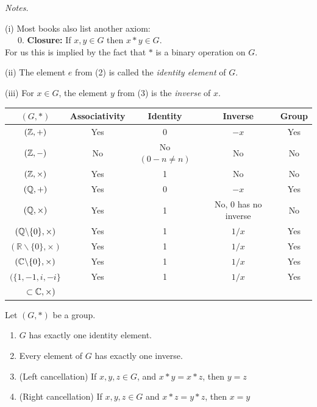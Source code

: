 \emph{Notes.}\\ \vspace*{-5pt}

 (i) Most books also list another axiom:\\ \vspace*{5pt}
~~~0. \textbf{Closure: }If $x,y \in G$ then $x * y \in G$.\\
For us this is implied by the fact that $*$ is a binary operation on $G$.

(ii) The element $e$ from (2) is called the \emph{identity element} of $G$.

(iii) For $x \in G$, the element $y$ from (3) is the \emph{inverse} of $x$.

\begin{examples}
{\renewcommand{\arraystretch}{1.3}
\begin{table}[H]
\centering
    \begin{tabular}{ccccc}
    \hline
    $(G, *)$ & Associativity & Identity & Inverse & Group \\ \hline
    $(\mathbb{Z},+)$ & Yes & $0$ & $-x$ & Yes \\
    $(\mathbb{Z},-) $  & No & No {\tiny $(0 -n \neq n)$} & No & No\\
    $(\mathbb{Z}, \times)$ & Yes & 1 & No & No \\
    $(\mathbb{Q}, +)$ & Yes & $0$ & $-x$ & Yes\\
    $(\mathbb{Q},\times)$ & Yes & 1 & No, {\tiny 0 has no inverse} & No\\
    $(\mathbb{Q}\backslash\{0\},\times)$ & Yes & 1 & $1/x$ & Yes\\ 
    $( \mathbb{R}\backslash\{0\},\times)$ & Yes & 1 & $1/x$ & Yes\\ 
    $(\mathbb{C} \backslash\{0\},\times)$ & Yes & 1 & $1/x$ & Yes\\ 
    $(\{1,-1,i,-i\}$ & Yes & 1 & $1/x$ & Yes\vspace*{-5pt}\\ 
   $ ~~~~\subset \mathbb{C}, \times)$ &  & & & 
    \end{tabular}
\end{table}
}
\end{examples}


\begin{proposition} Let $(G,*)$ be a group. \begin{enumerate}
 \item $G$ has exactly one identity element.
 \item Every element of $G$ has exactly one inverse.
 \item (Left cancellation) If $x,y,z \in G$, and $x*y = x*z$, then $y = z$
 \item (Right cancellation) If $x,y,z \in G$ and $x*z = y*z$, then $x = y$
 \end{enumerate}
 \end{proposition}

